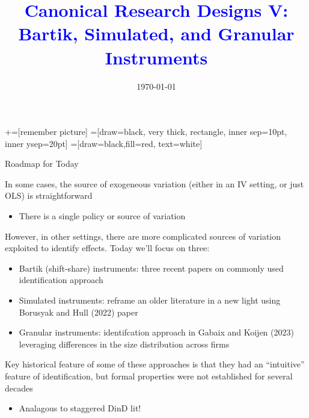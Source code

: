 \documentclass[notes,11pt, aspectratio=169]{beamer}
\title[]{\textcolor{blue}{Canonical Research Designs V:\\ Bartik, Simulated, and Granular Instruments }}
\author[PGP]{}
\institute[FRBNY]{\small{\begin{tabular}{c}
  Paul Goldsmith-Pinkham  \\
\end{tabular}}}
\date{\today}
\newenvironment{wideitemize}{\itemize\addtolength{\itemsep}{10pt}}{\enditemize}
\begin{document}
\newcommand\marktopleft[1]{%
    \tikz[overlay,remember picture] 
        \node (marker-#1-a) at (-.3em,.3em) {};%
}
\newcommand\markbottomright[2]{%
    \tikz[overlay,remember picture] 
        \node (marker-#1-b) at (0em,0em) {};%
}
+=[remember picture] 
 =[draw=black, very thick, rectangle, inner sep=10pt, inner ysep=20pt]
 =[draw=black,fill=red, text=white]

\begin{frame}
\maketitle
\end{frame}

\begin{frame}{Roadmap for Today}
  \begin{wideitemize}
  \item In some cases, the source of exogeneous variation (either in an IV setting, or just OLS) is straightforward
    \begin{itemize}
    \item There is a single policy or source of variation
    \end{itemize}
  \item However, in other settings, there are more complicated sources of variation exploited to identify effects. Today we'll focus on three:
    \begin{itemize}
    \item Bartik (shift-share) instruments: three recent
      papers on commonly used identification approach
    \item Simulated instruments: reframe an older literature in a new
      light using Borusyak and Hull (2022) paper
    \item Granular instruments: identifcation approach in Gabaix and
      Koijen (2023) leveraging differences in the size distribution
      across firms
    \end{itemize}
  \item Key historical feature of some of these approaches is that
    they had an ``intuitive'' feature of identification, but formal
    properties were not established for several decades
    \begin{itemize}
    \item Analagous to staggered DinD lit!
    \end{itemize}
  \end{wideitemize}
\end{frame}
\end{document}
